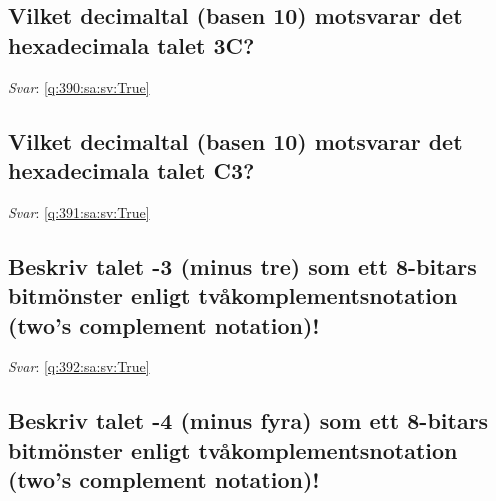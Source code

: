 \documentclass[a4paper,11pt,oneside]{article}
\begin{document}
\begin{sloppypar}
\subsection{Vilket decimaltal (basen 10) motsvarar det hexadecimala talet 3C?}

\label{q:390:sa:sv:False}

\vspace{2cm}

\noindent\makebox[\textwidth]{\hrulefill}

\vspace{1cm}

\textit{Svar}: \autoref{q:390:sa:sv:True}



\subsection{Vilket decimaltal (basen 10) motsvarar det hexadecimala talet C3?}

\label{q:391:sa:sv:False}

\vspace{2cm}

\noindent\makebox[\textwidth]{\hrulefill}

\vspace{1cm}

\textit{Svar}: \autoref{q:391:sa:sv:True}



\subsection{Beskriv talet -3 (minus tre) som ett 8-bitars bitm\"onster enligt tv\r{a}komplementsnotation (two{\textquoteright}s complement notation)!}

\label{q:392:sa:sv:False}

\vspace{2cm}

\noindent\makebox[\textwidth]{\hrulefill}

\vspace{1cm}

\textit{Svar}: \autoref{q:392:sa:sv:True}



\subsection{Beskriv talet -4 (minus fyra) som ett 8-bitars bitm\"onster enligt tv\r{a}komplementsnotation (two{\textquoteright}s complement notation)!}


\end{sloppypar}
\end{document}

